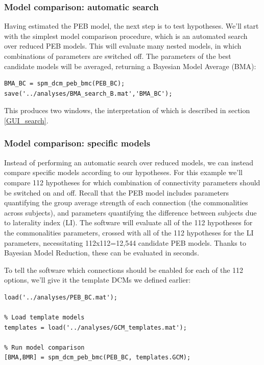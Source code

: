 \documentclass{article}
\begin{document}
\subsubsection{Model comparison: automatic search}

Having estimated the PEB model, the next step is to test hypotheses. We'll start with the simplest model comparison procedure, which is an automated search over reduced PEB models. This will evaluate many nested models, in which combinations of parameters are switched off. The parameters of the best candidate models will be averaged, returning a Bayesian Model Average (BMA):

\begin{lstlisting}[style=Matlab-editor,caption=Automatic PEB search]
BMA_BC = spm_dcm_peb_bmc(PEB_BC);
save('../analyses/BMA_search_B.mat','BMA_BC');          
\end{lstlisting}

This produces two windows, the interpretation of which is described in section \ref{GUI_search}.

\subsubsection{Model comparison: specific models}
Instead of performing an automatic search over reduced models, we can instead compare specific models according to our hypotheses. For this example we'll compare 112 hypotheses for which combination of connectivity parameters should be switched on and off. Recall that the PEB model includes parameters quantifying the group average strength of each connection (the commonalities across subjects), and parameters quantifying the difference between subjects due to laterality index (LI). The software will evaluate all of the 112 hypotheses for the commonalities parameters, crossed with all of the 112 hypotheses for the LI parameters, necessitating 112x112=12,544 candidate PEB models. Thanks to Bayesian Model Reduction, these can be evaluated in seconds.

To tell the software which connections should be enabled for each of the 112 options, we'll give it the template DCMs we defined earlier:

\begin{lstlisting}[style=Matlab-editor,caption=Compare specific PEB models]
% Load estimated PEB
load('../analyses/PEB_BC.mat');

% Load template models
templates = load('../analyses/GCM_templates.mat');

% Run model comparison
[BMA,BMR] = spm_dcm_peb_bmc(PEB_BC, templates.GCM);
\end{lstlisting}
\end{document}
